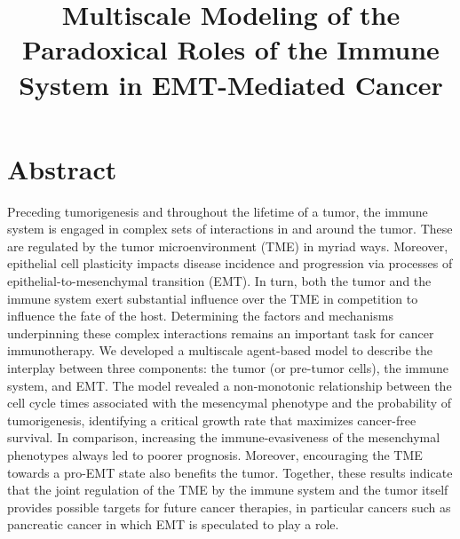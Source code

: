 \documentclass[11pt, a4paper, preprint]{article}
\title{Multiscale Modeling of the Paradoxical Roles of the Immune System in EMT-Mediated Cancer}
\author{}
\newcommand{\tcr} { \textcolor{red} }
\begin{document}
\maketitle


\section*{Abstract}
Preceding tumorigenesis and throughout the lifetime of a tumor, the immune system is engaged in complex sets of interactions in and around the tumor.
These are regulated by the tumor microenvironment (TME) in myriad ways. Moreover,  epithelial cell plasticity impacts disease incidence and progression via processes of epithelial-to-mesenchymal transition (EMT).
In turn, both the tumor and the immune system exert substantial influence over the TME in competition to influence the fate of the host.
Determining the factors and mechanisms underpinning these complex interactions remains an important task for cancer immunotherapy.
We developed a multiscale agent-based model to describe the interplay between three components: the tumor (or pre-tumor cells), the immune system, and EMT.
The model revealed a non-monotonic relationship between the cell cycle times associated with the mesencymal phenotype and the probability of tumorigenesis, identifying a critical growth rate that maximizes cancer-free survival. In comparison, increasing the immune-evasiveness of the mesenchymal phenotypes always led to poorer prognosis. Moreover, encouraging
the TME
towards a pro-EMT state also benefits the tumor.
Together, these results indicate that the joint regulation of the TME by the immune system and the tumor itself provides possible targets for future cancer therapies, in particular cancers such as pancreatic cancer in which EMT is speculated to play a role.

\end{document}
